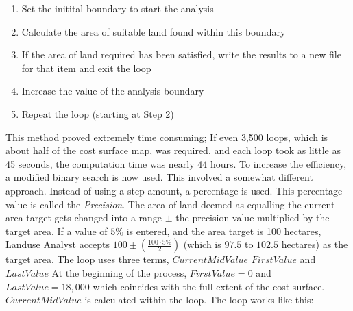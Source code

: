    \begin{enumerate} 
   
   \item  Set the initital boundary to start the analysis
   
   \item  Calculate the area of suitable land found within this boundary 
   
   \item If the area of land required has been satisfied, write the results to a new
   file for that item and exit the loop 
   
   \item  Increase the value of the analysis boundary 
   
   \item  Repeat the loop (starting at Step 2)
   
   \end{enumerate}

This method proved extremely time consuming;  If even 3,500 loops, which is
about half of the cost surface map, was required, and each loop took as little
as 45 seconds, the computation time was nearly 44 hours.   To increase the
efficiency, a modified binary search is now used.  This involved a somewhat
different approach.  Instead of using a step amount, a percentage is used.
This percentage value is called the \textit{Precision}. 
The area of land deemed as equalling the current area target gets changed into
a range $\pm$ the precision value multiplied by the target area. 
If a value of $5\%$ is entered, and the area
target is 100 hectares, Landuse Analyst accepts $100 \pm(\frac{100 \cdot
5\%}{2})$ (which is $97.5$ to $102.5$ hectares) as the target area.  The loop
uses three terms, $CurrentMidValue$ $FirstValue$ and $LastValue$ At the
beginning of the process, $FirstValue=0$ and $LastValue=18,000$ which coincides
with the full extent of the cost surface.  $CurrentMidValue$ is calculated
within the loop.  The loop works like this:

